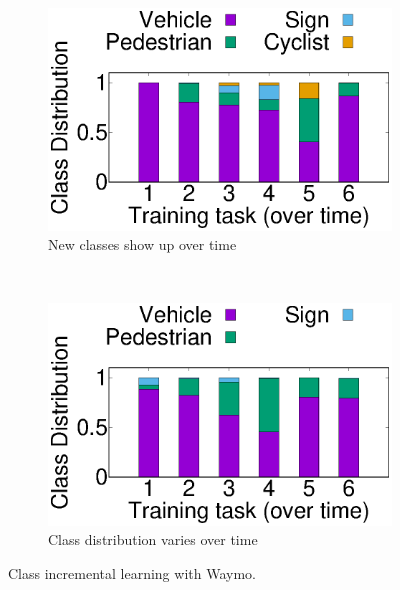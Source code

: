 \begin{figure}[t]
  \begin{subfigure}[t]{0.5\linewidth}
    \centering
    \includegraphics[width=\linewidth]{figures/motivation/Class_Incrementality/new_class.eps}
    \caption{\small New classes show up over time}
  \end{subfigure}
  ~~
  \begin{subfigure}[t]{0.5\linewidth}
    \centering
    \includegraphics[width=\linewidth]{figures/motivation/Class_Incrementality/class_dist_change.eps} 
    \caption{\small Class distribution varies over time}
    \label{fig:class-distrib-motivation}
  \end{subfigure}
  
  \caption{Class incremental learning with Waymo.   }
  \label{fig:waymo-motivation}
\end{figure}


